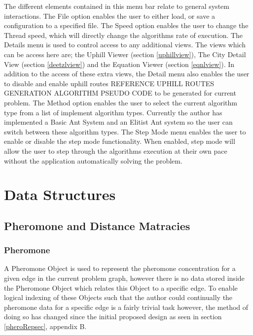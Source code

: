 The different elements contained in this menu bar relate to general system interactions. The File option enables the user to either load, or save a configuration to a specified file. The Speed option enables the user to change the Thread speed, which will directly change the algorithms rate of execution. The Details menu is used to control access to any additional views. The views which can be access here are; the Uphill Viewer (section \ref{uphillview}), The City Detail View (section \ref{deetzlview}) and the Equation Viewer (section \ref{eqnlview}). In addition to the access of these extra views, the Detail menu also enables the user to disable and enable uphill routes \Large REFERENCE UPHILL ROUTES GENERATION ALGORITHM PSEUDO CODE \normalsize to be generated for current problem. The Method option enables the user to select the current algorithm type from a list of implement algorithm types. Currently the author has implemented a Basic Ant System and an Elitist Ant system so the user can switch between these algorithm types. The Step Mode menu enables the user to enable or disable the step mode functionality. When enabled, step mode will allow the user to step through the algorithms execution at their own pace without the application automatically solving the problem.

\section{Data Structures}

\subsection{Pheromone and Distance Matracies}

\subsubsection{Pheromone}
\label{phero:struct}
A Pheromone Object is used to represent the pheromone concentration for a given edge in the current problem graph, however there is no data stored inside the Pheromone Object which relates this Object to a specific edge. To enable logical indexing of these Objects such that the author could continually the pheromone data for a specific edge is a fairly trivial task however, the method of doing so has changed since the initial proposed design as seen in section \ref{pheroRepsec}, appendix B.

